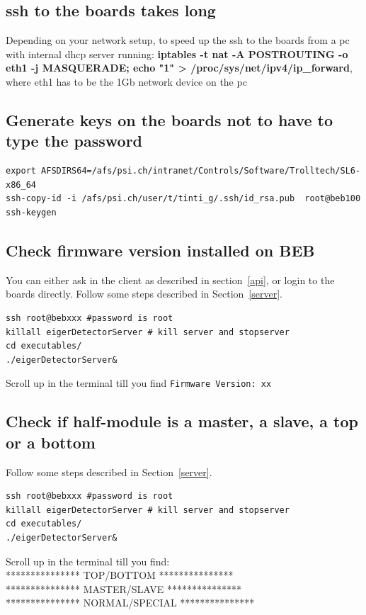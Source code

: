 \documentclass{article}
\begin{document}
\subsection{ssh to the boards takes long}
Depending on your network setup,  to speed up the ssh to the boards from a pc with internal dhcp server running: \textbf{iptables -t nat -A POSTROUTING -o eth1 -j MASQUERADE; echo "1" > /proc/sys/net/ipv4/ip\_forward}, where eth1 has to be the 1Gb network device on the pc

\subsection{Generate keys on the boards not to have to type the password}
\begin{verbatim}
export AFSDIRS64=/afs/psi.ch/intranet/Controls/Software/Trolltech/SL6-x86_64
ssh-copy-id -i /afs/psi.ch/user/t/tinti_g/.ssh/id_rsa.pub  root@beb100
ssh-keygen
\end{verbatim}

\subsection{Check firmware version installed on BEB}
You can either ask in the client as described in section~\ref{api}, or login to the boards directly. Follow some steps described in Section~\ref{server}. 
\begin{verbatim}
ssh root@bebxxx #password is root
killall eigerDetectorServer # kill server and stopserver
cd executables/
./eigerDetectorServer&
\end{verbatim}
Scroll up in the terminal till you find {\tt{Firmware Version: xx}}

\subsection{Check if half-module is a master, a slave, a top or a bottom}
Follow some steps described in Section~\ref{server}.
\begin{verbatim}
ssh root@bebxxx #password is root
killall eigerDetectorServer # kill server and stopserver
cd executables/
./eigerDetectorServer&
\end{verbatim}
Scroll up in the terminal till you find:\\
*************** TOP/BOTTOM ***************\\
*************** MASTER/SLAVE ***************\\
*************** NORMAL/SPECIAL ***************\\
\end{document}
